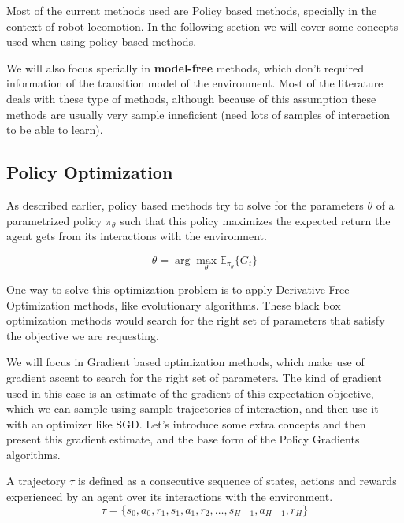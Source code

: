Most of the current methods used are Policy based methods, specially in the context
of robot locomotion. In the following section we will cover some concepts used when
using policy based methods. 

We will also focus specially in \textbf{model-free} methods,
which don't required information of the transition model of the environment. Most of the
literature deals with these type of methods, although because of this assumption these
methods are usually very sample inneficient (need lots of samples of interaction to be
able to learn).

\subsection{Policy Optimization}

As described earlier, policy based methods try to solve for the parameters $\theta$
of a parametrized policy $\pi_{\theta}$ such that this policy maximizes the expected
return the agent gets from its interactions with the environment.

\begin{equation}
    \theta = \arg \max_\theta \mathbb{E}_{\pi_{\theta}} \lbrace G_{t} \rbrace
\end{equation}

One way to solve this optimization problem is to apply Derivative Free Optimization
methods, like evolutionary algorithms. These black box optimization methods would
search for the right set of parameters that satisfy the objective we are requesting.

We will focus in Gradient based optimization methods, which make use of gradient
ascent to search for the right set of parameters. The kind of gradient used in this
case is an estimate of the gradient of this expectation objective, which we can sample
using sample trajectories of interaction, and then use it with an optimizer like
SGD. Let's introduce some extra concepts and then present this gradient estimate,
and the base form of the Policy Gradients algorithms.

\begin{definition}
    A trajectory $\tau$ is defined as a consecutive sequence of states, actions 
    and rewards experienced by an agent over its interactions with the environment.
    \begin{equation}
        \tau = \lbrace s_{0},a_{0},r_{1},s_{1},a_{1},r_{2},\hdots,s_{H-1},a_{H-1},r_{H} \rbrace
    \end{equation}
\end{definition}

